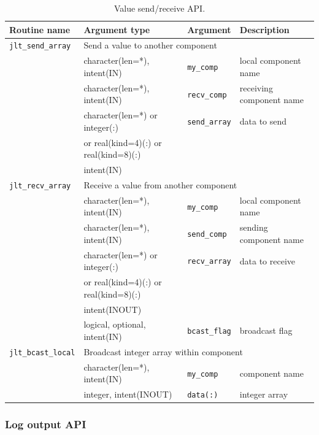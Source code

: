 \documentclass[11pt,a4paper]{report}
\begin{document}
\begin{table}[H]
\begin{center}
\caption{Value send/receive API.}
{\small
\label{table:jlt_api_sendrecv}
\begin{tabular}{llll}
\hline\hline
Routine name & Argument type & Argument & Description \\
\hline
 \texttt{jlt\_send\_array} &  \multicolumn{3}{l}{Send a value to another component}\\
           &  character(len=*), intent(IN) & \texttt{my\_comp}  & local component name\\
           &  character(len=*), intent(IN) & \texttt{recv\_comp}  & receiving component name\\
           & character(len=*) or integer(:)  & \texttt{send\_array} & data to send\\
           & or real(kind=4)(:) or real(kind=8)(:) & & \\
           & intent(IN) & & \\
\hline
 \texttt{jlt\_recv\_array} &  \multicolumn{3}{l}{Receive a value from another component}\\
           &  character(len=*), intent(IN) & \texttt{my\_comp}  & local component name\\
           &  character(len=*), intent(IN) & \texttt{send\_comp}  & sending component name\\
           & character(len=*) or integer(:)  & \texttt{recv\_array} & data to receive\\
           & or real(kind=4)(:) or real(kind=8)(:) & & \\
           & intent(INOUT) & & \\
           & logical, optional, intent(IN) & \texttt{bcast\_flag} & broadcast flag\\
\hline
 \texttt{jlt\_bcast\_local} &  \multicolumn{3}{l}{Broadcast integer array within component}\\
           &  character(len=*), intent(IN) & \texttt{my\_comp}  & component name\\
           &  integer, intent(INOUT) & \texttt{data(:)} & integer array\\
\hline\hline
\end{tabular}
}
\end{center}
\end{table}


\subsubsection{Log output API}
\end{document}
